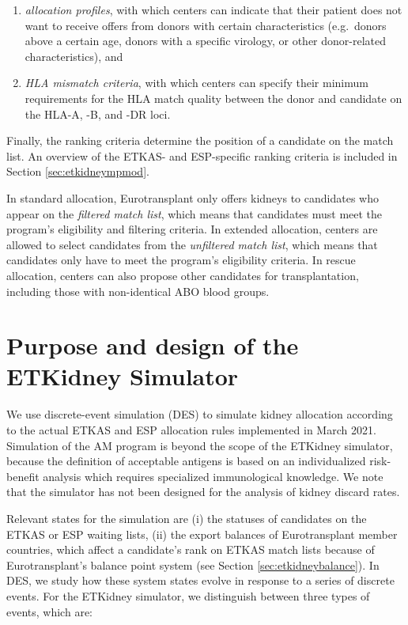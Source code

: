 \documentclass[11pt,twoside,]{book}
\providecommand{\tightlist}{%
  \setlength{\itemsep}{0pt}\setlength{\parskip}{0pt}}
\begin{document}
\begin{enumerate}
\def\labelenumi{\arabic{enumi}.}
\tightlist
\item
  \emph{allocation profiles}, with which centers can indicate that their
  patient does not want to receive offers from donors with certain
  characteristics (e.g.~donors above a certain age, donors with a specific
  virology, or other donor-related characteristics), and
\item
  \emph{HLA mismatch criteria}, with which centers can specify their minimum
  requirements for the HLA match quality between the donor and
  candidate on the HLA-A, -B, and -DR loci.
\end{enumerate}

Finally, the ranking criteria determine the position of a candidate on the
match list. An overview of the ETKAS- and ESP-specific ranking criteria is included
in Section \ref{sec:etkidneympmod}.

In standard allocation, Eurotransplant only offers kidneys to candidates
who appear on the \emph{filtered match list}, which means that candidates must
meet the program's eligibility and filtering criteria. In extended allocation,
centers are allowed to select candidates from the \emph{unfiltered match list},
which means that candidates only have to meet the program's eligibility criteria.
In rescue allocation, centers can also propose other candidates
for transplantation, including those with
non-identical ABO blood groups.

\section{Purpose and design of the ETKidney Simulator}\label{sec:etkidneydesign}

We use discrete-event simulation (DES) to simulate kidney allocation according to the
actual ETKAS and ESP allocation rules implemented in March 2021. Simulation of
the AM program is beyond the scope of the ETKidney simulator, because
the definition of acceptable antigens is based on an individualized
risk-benefit analysis which requires specialized immunological
knowledge. We note that the simulator has not been designed for the analysis of
kidney discard rates.

Relevant states for the simulation are (i) the statuses of candidates on the ETKAS or ESP
waiting lists, (ii) the export
balances of Eurotransplant member countries, which affect a candidate's
rank on ETKAS match lists because of Eurotransplant's balance point
system (see Section \ref{sec:etkidneybalance}). In DES, we study how these system states
evolve in response to a series of discrete events. For the ETKidney
simulator, we distinguish between three types of events, which are:
\end{document}
